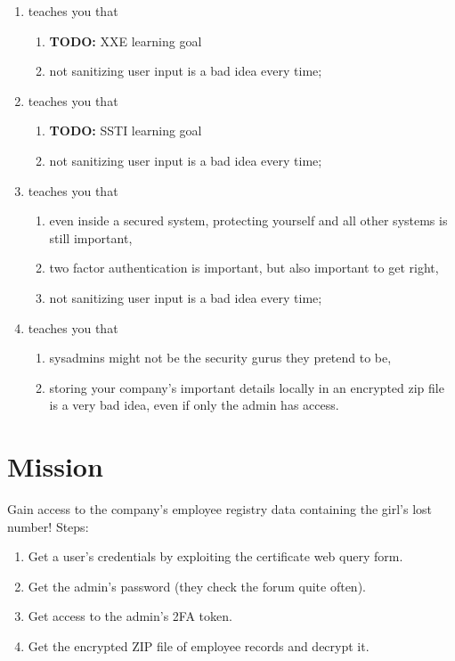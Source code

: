 \documentclass[a4paper]{article}
\newcommand{\TODO}[1]{\begin{center}\large\textbf{TODO:} #1\end{center}}
\begin{document}
\begin{enumerate}
  \item teaches you that
        \begin{enumerate}
          \item \TODO{XXE learning goal}
          \item not sanitizing user input is a bad idea every time;
        \end{enumerate}

  \item teaches you that
        \begin{enumerate}
          \item \TODO{SSTI learning goal}
          \item not sanitizing user input is a bad idea every time;
        \end{enumerate}

  \item teaches you that
        \begin{enumerate}
          \item even inside a secured system, protecting yourself and all other systems
                is still important,
          \item two factor authentication is important, but also important to get right,
          \item not sanitizing user input is a bad idea every time;
        \end{enumerate}

  \item teaches you that
        \begin{enumerate}
          \item sysadmins might not be the security gurus they pretend to be,
          \item storing your company's important details locally in an encrypted zip
                file is a very bad idea, even if only the admin has access.
        \end{enumerate}

\end{enumerate}

\section{Mission}

Gain access to the company's employee registry data containing the
girl's lost number! Steps:

\begin{enumerate}
  \item Get a user's credentials by exploiting the certificate web query form.
  \item Get the admin's password (they check the forum quite often).
  \item Get access to the admin's 2FA token.
  \item Get the encrypted ZIP file of employee records and decrypt it.
\end{enumerate}
\end{document}
